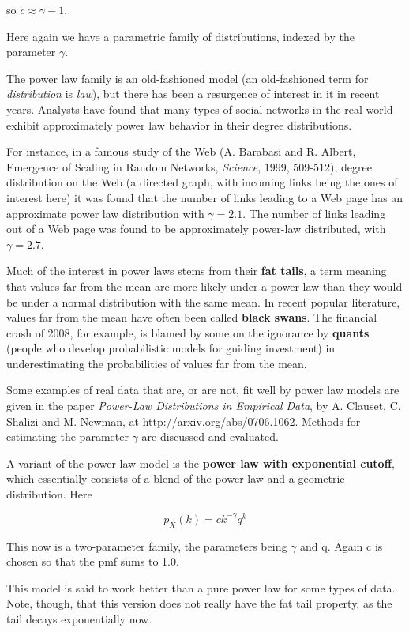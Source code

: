 so $c \approx \gamma -1$.

Here again we have a parametric family of distributions, indexed by the
parameter $\gamma$.

The power law family is an old-fashioned model (an old-fashioned term
for {\it distribution} is {\it law}), but  there has been a resurgence
of interest in it in recent years.  Analysts have found that many types
of social networks in the real world exhibit approximately power law
behavior in their degree distributions.

For instance, in a famous study of the Web (A. Barabasi and R. Albert,
Emergence of Scaling in Random Networks, {\it Science}, 1999, 509-512),
degree distribution on the Web (a directed graph, with incoming links
being the ones of interest here) it was found that the number of links
leading to a Web page has an approximate power law distribution with
$\gamma =2.1$.  The number of links leading out of a Web page was found
to be approximately power-law distributed, with $\gamma = 2.7$.

Much of the interest in power laws stems from their {\bf fat tails}, a
term meaning that values far from the mean are more likely under a power
law than they would be under a normal distribution with the same mean.
In recent popular literature, values far from the mean have often been
called {\bf black swans}.  The financial crash of 2008, for example, is
blamed by some on the ignorance by {\bf quants} (people who develop
probabilistic models for guiding investment) in underestimating the
probabilities of values far from the mean.

Some examples of real data that are, or are not, fit well by power law
models are given in the paper {\it Power-Law Distributions in Empirical
Data}, by A. Clauset, C. Shalizi and M. Newman, at
\url{http://arxiv.org/abs/0706.1062}.  Methods for estimating the
parameter $\gamma$ are discussed and evaluated.

A variant of the power law model is the {\bf power law with exponential
cutoff}, which essentially consists of a blend of the power law and a
geometric distribution.  Here

\begin{equation}
p_X(k) = c k^{-\gamma} q^k
\end{equation}

This now is a two-parameter family, the parameters being $\gamma$ and q.
Again c is chosen so that the pmf sums to 1.0.

This model is said to work better than a pure power law for some types
of data.  Note, though, that this version does not really have the fat
tail property, as the tail decays exponentially now.

